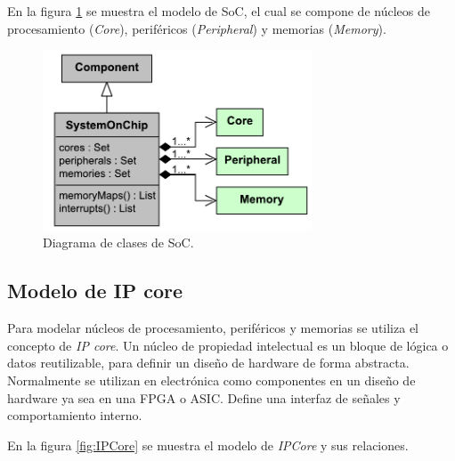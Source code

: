 En la figura \ref{fig:ModelSoC} se muestra el modelo de SoC, el cual se compone de núcleos de procesamiento (\emph{Core}), periféricos (\emph{Peripheral}) y memorias (\emph{Memory}).

\begin{figure}[!htbp]
\begin{center}  %
\includegraphics*[width=8cm]{Figures/SoC.pdf}
\par\caption{Diagrama de clases de SoC.}\label{fig:ModelSoC}
\end{center}
\end{figure}

\subsection{Modelo de IP core}
\label{sec:modelSoC}

Para modelar núcleos de procesamiento, periféricos y memorias se utiliza el concepto de \emph{IP core}. Un núcleo de propiedad intelectual es un bloque de lógica o datos reutilizable, para definir un diseño de hardware de forma abstracta. Normalmente se utilizan en electrónica como componentes en un diseño de hardware ya sea en una FPGA o ASIC. Define una interfaz de señales y comportamiento interno.

En la figura \ref{fig:IPCore} se muestra el modelo de \emph{IPCore} y sus relaciones.

